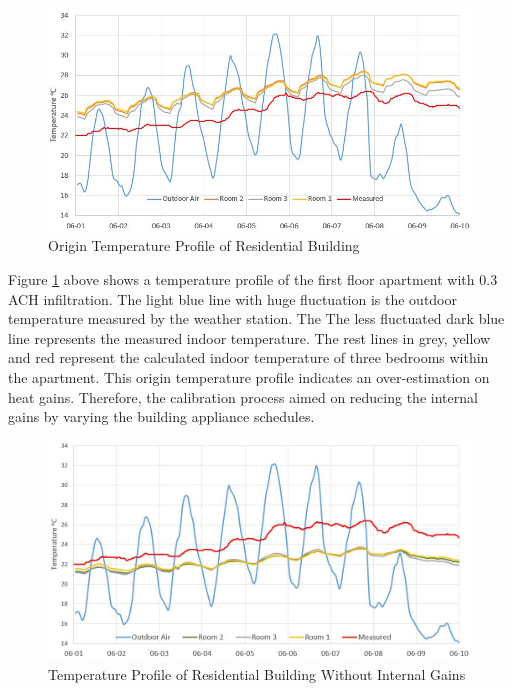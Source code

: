 \documentclass[a4paper, oneside]{discothesis}
\begin{document}
			\begin{figure}[H]
			\centering
			\includegraphics[scale=0.6]{figures/Hongg_Clibration_Origin.JPG}
			\caption{Origin Temperature Profile of Residential Building}
			\label{fig:HonggCalibrationOrigin}
			\end{figure}
			
			Figure \ref{fig:HonggCalibrationOrigin} above shows a temperature profile of the first floor apartment with 0.3 ACH infiltration. The light blue line with huge fluctuation is the outdoor temperature measured by the weather station. The The less fluctuated dark blue line represents the measured indoor temperature. The rest lines in grey, yellow and red represent the calculated indoor temperature of three bedrooms within the apartment. This origin temperature profile indicates an over-estimation on heat gains. Therefore, the calibration process aimed on reducing the internal gains by varying the building appliance schedules.\\
			
			\begin{figure}[H]
			\centering
			\includegraphics[scale=0.5]{figures/Hongg_Cali_NoFacility.JPG}
			\caption{Temperature Profile of Residential Building Without Internal Gains}
			\label{fig:HonggCalibrationNoGains}
			\end{figure}
			
\end{document}
